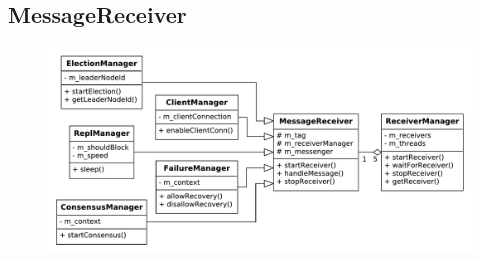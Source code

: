 \documentclass[11pt]{article}
\begin{document}
\subsection{MessageReceiver}
\begin{figure}[H]
\includegraphics[scale=0.6]{image/receiver.pdf}
\centering
\end{figure}
\end{document}
